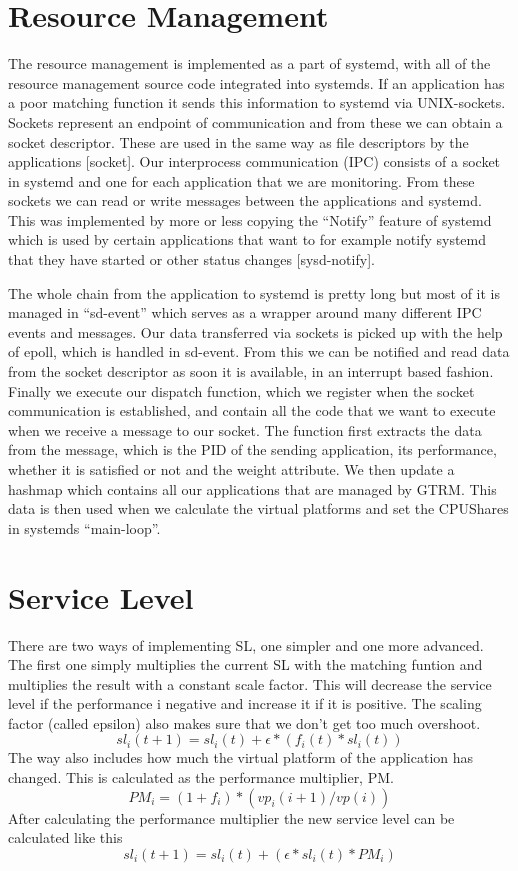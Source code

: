 \documentclass{LTHthesis}
\begin{document}
\section{Resource Management} 
The resource management is implemented as a part of systemd, with all of the resource management source code integrated into systemds. If an application has a poor matching function it sends this information to systemd via UNIX-sockets. Sockets represent an endpoint of communication and from these we can obtain a socket descriptor. These are used in the same way as file descriptors by the applications [socket]. Our interprocess communication (IPC) consists of a socket in systemd and one for each application that we are monitoring. From these sockets we can read or write messages between the applications and systemd. This was implemented by more or less copying the “Notify” feature of systemd which is used by certain applications that want to for example notify systemd that they have started or other status changes [sysd-notify].

The whole chain from the application to systemd is pretty long but most of it is managed in “sd-event” which serves as a wrapper around many different IPC events and messages. Our data transferred via sockets is picked up with the help of epoll, which is handled in sd-event. From this we can be notified and read data from the socket descriptor as soon it is available, in an interrupt based fashion. Finally we execute our dispatch function, which we register when the socket communication is established, and contain all the code that we want to execute when we receive a message to our socket. The function first extracts the data from the message, which is the PID of the sending application, its performance, whether it is satisfied or not and the weight attribute. We then update a hashmap which contains all our applications that are managed by GTRM. This data is then used when we calculate the virtual platforms and set the CPUShares in systemds “main-loop”.

\section{Service Level}
There are two ways of implementing SL, one simpler and one more advanced. The first one simply multiplies the current SL with the matching funtion and multiplies the result with a constant scale factor. This will decrease the service level if the performance i negative and increase it if it is positive. The scaling factor (called epsilon) also makes sure that we don't get too much overshoot. 
\[sl_i(t+1)= sl_i(t) + \epsilon*(f_i(t)*sl_i(t)) \]
The way also includes how much the virtual platform of the application has changed. This is calculated as the performance multiplier, PM.
\[PM_i = (1+f_i)*(vp_i(i+1)/vp(i))\]
After calculating the performance multiplier the new service level can be calculated like this
\[sl_i(t+1)=sl_i(t) + (\epsilon*sl_i(t)*PM_i)\]
\end{document}
